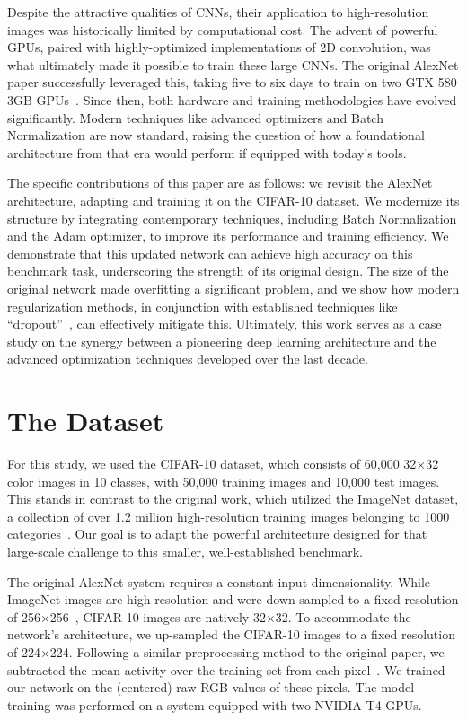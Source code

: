 \documentclass{article}
\begin{document}
Despite the attractive qualities of CNNs, their application to high-resolution images was historically limited by computational cost. The advent of powerful GPUs, paired with highly-optimized implementations of 2D convolution, was what ultimately made it possible to train these large CNNs. The original AlexNet paper successfully leveraged this, taking five to six days to train on two GTX 580 3GB GPUs~\cite{krizhevsky2012imagenet}. Since then, both hardware and training methodologies have evolved significantly. Modern techniques like advanced optimizers and Batch Normalization are now standard, raising the question of how a foundational architecture from that era would perform if equipped with today's tools.

\newpage
The specific contributions of this paper are as follows: we revisit the AlexNet architecture, adapting and training it on the CIFAR-10 dataset. We modernize its structure by integrating contemporary techniques, including Batch Normalization and the Adam optimizer, to improve its performance and training efficiency. We demonstrate that this updated network can achieve high accuracy on this benchmark task, underscoring the strength of its original design. The size of the original network made overfitting a significant problem, and we show how modern regularization methods, in conjunction with established techniques like ``dropout''~\cite{hinton2012improving}, can effectively mitigate this. Ultimately, this work serves as a case study on the synergy between a pioneering deep learning architecture and the advanced optimization techniques developed over the last decade.

\section{The Dataset}
\label{sec:dataset}
\noindent
For this study, we used the CIFAR-10 dataset, which consists of 60,000 32$\times$32 color images in 10 classes, with 50,000 training images and 10,000 test images. This stands in contrast to the original work, which utilized the ImageNet dataset, a collection of over 1.2 million high-resolution training images belonging to 1000 categories~\cite{deng2009imagenet}. Our goal is to adapt the powerful architecture designed for that large-scale challenge to this smaller, well-established benchmark.

The original AlexNet system requires a constant input dimensionality. While ImageNet images are high-resolution and were down-sampled to a fixed resolution of 256$\times$256~\cite{krizhevsky2012imagenet}, CIFAR-10 images are natively 32$\times$32. To accommodate the network's architecture, we up-sampled the CIFAR-10 images to a fixed resolution of 224$\times$224. Following a similar preprocessing method to the original paper, we subtracted the mean activity over the training set from each pixel~\cite{krizhevsky2012imagenet}. We trained our network on the (centered) raw RGB values of these pixels. The model training was performed on a system equipped with two NVIDIA T4 GPUs.
\end{document}

